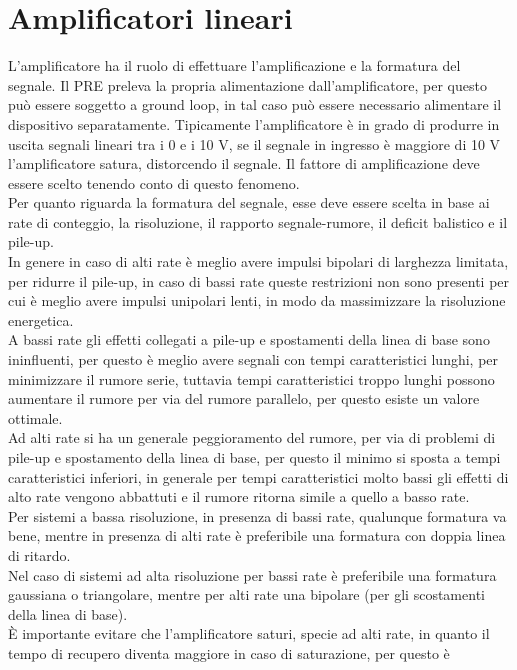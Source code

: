 \section{Amplificatori lineari}
L'amplificatore ha il ruolo di effettuare l'amplificazione e la formatura del segnale.
Il PRE preleva la propria alimentazione dall'amplificatore, per questo pu\`o essere soggetto a ground loop, in tal caso pu\`o essere necessario alimentare il dispositivo separatamente.
Tipicamente l'amplificatore \`e in grado di produrre in uscita segnali lineari tra i 0 e i 10 V, se il segnale in ingresso \`e maggiore di 10 V l'amplificatore satura,
distorcendo il segnale.
Il fattore di amplificazione deve essere scelto tenendo conto di questo fenomeno.\\
Per quanto riguarda la formatura del segnale, esse deve essere scelta in base ai rate di conteggio, la risoluzione, il rapporto segnale-rumore, il deficit balistico
e il pile-up.\\
In genere in caso di alti rate \`e meglio avere impulsi bipolari di larghezza limitata, per ridurre il pile-up, in caso di bassi rate queste restrizioni non sono presenti
per cui \`e meglio avere impulsi unipolari lenti, in modo da massimizzare la risoluzione energetica.\\
A bassi rate gli effetti collegati a pile-up e spostamenti della linea di base sono ininfluenti, per questo \`e meglio avere segnali con tempi caratteristici lunghi,
per minimizzare il rumore serie, tuttavia tempi caratteristici troppo lunghi possono aumentare il rumore per via del rumore parallelo, per questo esiste un valore ottimale.\\
Ad alti rate si ha un generale peggioramento del rumore, per via di problemi di pile-up e spostamento della linea di base, per questo il minimo si sposta
a tempi caratteristici inferiori, in generale per tempi caratteristici molto bassi gli effetti di alto rate vengono abbattuti e il rumore ritorna simile a
quello a basso rate.\\
Per sistemi a bassa risoluzione, in presenza di bassi rate, qualunque formatura va bene, mentre in presenza di alti rate \`e preferibile una formatura con
doppia linea di ritardo.\\
Nel caso di sistemi ad alta risoluzione per bassi rate \`e preferibile una formatura gaussiana o triangolare, mentre per alti rate una bipolare (per gli scostamenti
della linea di base).\\
\`E importante evitare che l'amplificatore saturi, specie ad alti rate, in quanto il tempo di recupero diventa maggiore in caso di saturazione, per questo \`e
